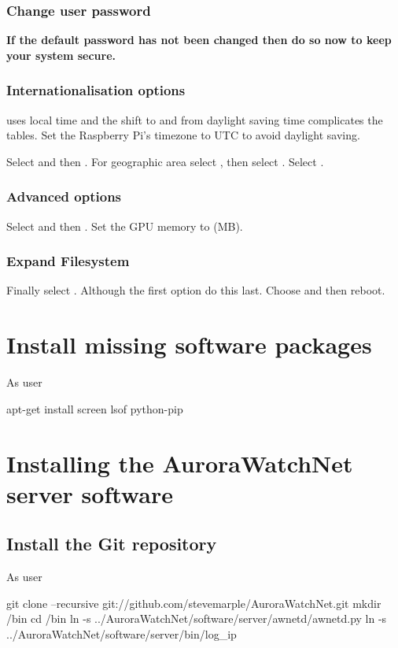 \subsubsection{Change user password}
\textbf{If the default password has not been changed then do so now to keep
your system secure.}

\subsubsection{Internationalisation options}
 uses local time and the shift to and from daylight
saving time complicates the  tables. Set the Raspberry
Pi's timezone to UTC to avoid daylight saving.

Select  and
then . For geographic area select %
, then select . Select .

\subsubsection{Advanced options}
Select  and then . Set the GPU memory to  (MB).

\subsubsection{Expand Filesystem}
Finally select . Although the first option
do this last. Choose  and then reboot.

\section{Install missing software packages}
As user \rootUser
\begin{Cmd}
apt-get install screen lsof python-pip
\end{Cmd}

\section{Installing the AuroraWatchNet server software}

\subsection{Install the Git repository}
As user \piUser
\begin{Cmd}
git clone --recursive git://github.com/stevemarple/AuroraWatchNet.git
mkdir \mytilde/bin
cd \mytilde/bin
ln -s ../AuroraWatchNet/software/server/awnetd/awnetd.py
ln -s ../AuroraWatchNet/software/server/bin/log_ip
\end{Cmd}

